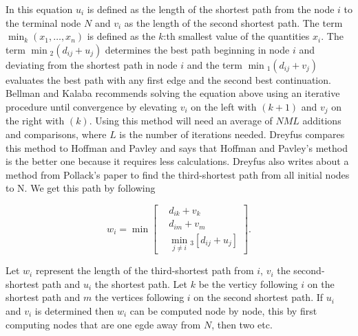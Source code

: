 \documentclass{article}
\begin{document}
\noindent In this equation $u_i$ is defined as the length of the shortest path from the node $i$
to the terminal node $N$ and $v_i$ as the length of the second shortest path. 
The term $\min_k(x_1, \dots, x_n)$ is defined as the $k$:th smallest value of the quantities $x_i$.
The term $\min \!_2(d_{ij}+u_j)$ determines the best path beginning in node $i$ 
and deviating from the shortest path in node $i$ and the term $\min\!_1(d_{ij}+v_j) $
evaluates the best path with any first edge and the second best continuation. 
Bellman and Kalaba recommends solving the equation above using an iterative procedure 
until convergence by elevating $v_i$ on the left with $(k+1)$ and $v_j$ on the right with $(k)$. 
Using this method will need an average of $NML$ additions and comparisons, where $L$ is the 
number of iterations needed. Dreyfus compares this method to Hoffman and Pavley and 
says that Hoffman and Pavley's method is the better one because it requires less 
calculations.
\vspace{2mm}
Dreyfus also writes about a method from Pollack's\cite{m_pollack} paper to find the 
third-shortest path from all initial nodes to N. We get this path by following

\begin{equation}
    w_i = \min \left[
    \begin{aligned}
        & d_{ik} + v_k \\
        & d_{im} + v_m \\
        & \min_{j \neq i} \!_3 [d_{ij} + u_j]
    \end{aligned}
    \right].
\end{equation}

\noindent Let $w_i$ represent the length of the third-shortest path from $i$,
$v_i$ the second-shortest path and $u_i$ the shortest path. Let $k$ be the verticy 
following $i$ on the shortest path and $m$ the vertices following $i$ on the second shortest path.
If $u_i$ and $v_i$ is determined then $w_i$ can be computed node by node, this 
by first computing nodes that are one egde away from $N$, then two etc. 

\newpage
\end{document}

